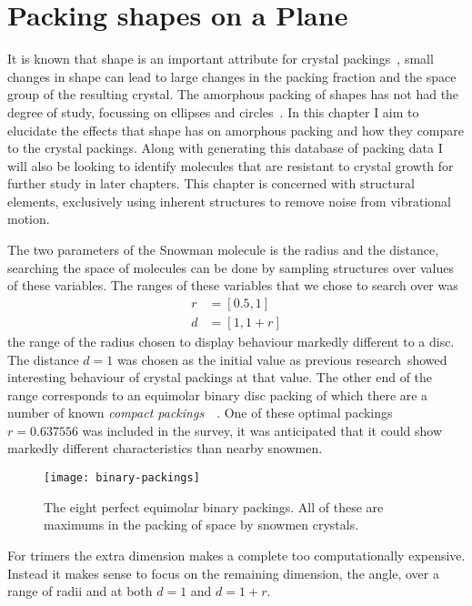 \chapter{Packing shapes on a Plane}

It is known that shape is an important attribute for crystal packings~\tocite, small changes in shape can lead to large changes in the packing fraction and the space group of the resulting crystal. The amorphous packing of shapes has not had the degree of study, focussing on ellipses and circles~\tocite. In this chapter I aim to elucidate the effects that shape has on amorphous packing and how they compare to the crystal packings. Along with generating this database of packing data I will also be looking to identify molecules that are resistant to crystal growth for further study in later chapters. This chapter is concerned with structural elements, exclusively using inherent structures to remove noise from vibrational motion.

The two parameters of the Snowman molecule is the radius and the distance, searching the space of molecules can be done by sampling structures over values of these variables. The ranges of these variables that we chose to search over was
\begin{align}
            r &= [0.5, 1] \\
            d &= [1,1+r]
\end{align}
the range of the radius chosen to display behaviour markedly different to a disc. The distance $d=1$ was chosen as the initial value as previous research~\tocite showed interesting behaviour of crystal packings at that value. The other end of the range corresponds to an equimolar binary disc packing of which there are a number of known \emph{compact packings}~~\cite{heppes:03,kennedy:06}. One of these optimal packings $r=0.637556$ was included in the survey, it was anticipated that it could show markedly different characteristics than nearby snowmen.

\begin{figure}
    \texttt{[image: binary-packings]}
    \caption[Perfect binary packings]{The eight perfect equimolar binary packings. All of these are maximums in the packing of space by snowmen crystals.}
    \label{fig:binary-packings}
\end{figure}

For trimers the extra dimension makes a complete too computationally expensive. Instead it makes sense to focus on the remaining dimension, the angle, over a range of radii and at both $d=1$ and $d=1+r$.


